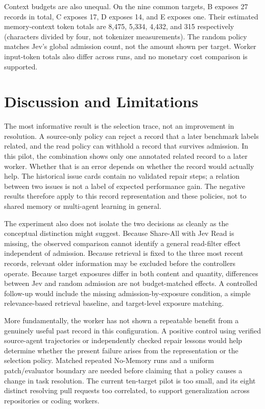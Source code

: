 \documentclass[sigconf,anonymous]{aamas}
\begin{document}
Context budgets are also unequal. On the nine common targets, B exposes 27 records in total, C exposes 17, D exposes 14, and E exposes one. Their estimated memory-context token totals are 8,475, 5,334, 4,432, and 315 respectively (characters divided by four, not tokenizer measurements). The random policy matches Jev's global admission count, not the amount shown per target. Worker input-token totals also differ across runs, and no monetary cost comparison is supported.

\section{Discussion and Limitations}
The most informative result is the selection trace, not an improvement in resolution. A source-only policy can reject a record that a later benchmark labels related, and the read policy can withhold a record that survives admission. In this pilot, the combination shows only one annotated related record to a later worker. Whether that is an error depends on whether the record would actually help. The historical issue cards contain no validated repair steps; a relation between two issues is not a label of expected performance gain. The negative results therefore apply to this record representation and these policies, not to shared memory or multi-agent learning in general.

The experiment also does not isolate the two decisions as cleanly as the conceptual distinction might suggest. Because Share-All with Jev Read is missing, the observed comparison cannot identify a general read-filter effect independent of admission. Because retrieval is fixed to the three most recent records, relevant older information may be excluded before the controllers operate. Because target exposures differ in both content and quantity, differences between Jev and random admission are not budget-matched effects. A controlled follow-up would include the missing admission-by-exposure condition, a simple relevance-based retrieval baseline, and target-level exposure matching.

More fundamentally, the worker has not shown a repeatable benefit from a genuinely useful past record in this configuration. A positive control using verified source-agent trajectories or independently checked repair lessons would help determine whether the present failure arises from the representation or the selection policy. Matched repeated No-Memory runs and a uniform patch/evaluator boundary are needed before claiming that a policy causes a change in task resolution. The current ten-target pilot is too small, and its eight distinct resolving pull requests too correlated, to support generalization across repositories or coding workers.
\end{document}
